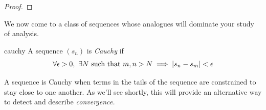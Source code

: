 \begin{proof}
\end{proof}

\goodbreak




We now come to a class of sequences whose analogues will dominate your study of analysis.

\begin{defn}{}{cauchy}
A sequence $(s_n)$ is \emph{Cauchy\footnotemark} if
\[\forall\epsilon>0,\ \exists N\ \text{such that}\  m,n>N\implies\left| s_n-s_m\right|<\epsilon\]
\end{defn}


A sequence is Cauchy when terms in the tails of the sequence are constrained to stay close to one another. As we'll see shortly, this will provide an alternative way to detect and describe \emph{convergence.}



